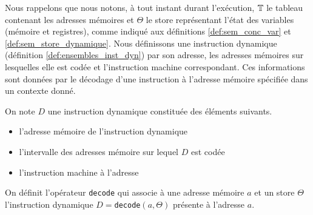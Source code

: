 \begin{center}
\end{center}

Nous rappelons que nous notons, à tout instant durant l'exécution, $\mathbb T$ le tableau contenant les adresses mémoires et $\Theta$ le store représentant l'état des variables (mémoire et registres), comme indiqué aux définitions \ref{def:sem_conc_var} et \ref{def:sem_store_dynamique}.
Nous définissons une instruction dynamique (définition \ref{def:ensembles_inst_dyn}) par son adresse, les adresses mémoires sur lesquelles elle est codée et l'instruction machine correspondant. Ces informations sont données par le décodage d'une instruction à l'adresse mémoire spécifiée dans un contexte donné. 

\begin{defi}
On note $D$ une instruction dynamique constituée des éléments suivants.
\begin{itemize}
 \item {} l'adresse mémoire de l'instruction dynamique
 \item {} l'intervalle des adresses mémoire sur lequel $D$ est codée
 \item {} l'instruction machine à l'adresse 
\end{itemize}
On définit l'opérateur \texttt{decode} qui associe à une adresse mémoire $a$ et un store $\Theta$ l'instruction dynamique $D=$\texttt{decode}$(a, \Theta)$ présente à l'adresse $a$.
\label{def:ensembles_inst_dyn}
\end{defi}

